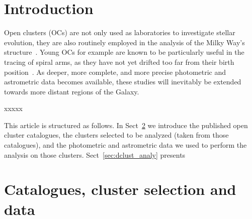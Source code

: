 \documentclass[draft]{aa}
\begin{document}

\maketitle


\section{Introduction}

 Open clusters (OCs) are not only used as laboratories to investigate stellar
 evolution, they are also routinely employed in the analysis of the Milky Way's
 structure~\citep{Loktin_1992,Moitinho_2006,Vazquez2008,Moitinho_2010}.
 Young OCs for example are known to be particularly
 useful in the tracing of spiral arms, as they have not yet drifted too far
 from their birth position~\citep{carraro_2013,Molina_2018}. As deeper, more
 complete, and more precise photometric and astrometric data becomes available,
 these studies will inevitably be extended towards more distant regions of the
 Galaxy.

 xxxxx

 This article is structured as follows. In Sect~\ref{sec:cat_clust_data} we
 introduce the published open cluster catalogues, the clusters selected to be
 analyzed (taken from those catalogues), and the photometric and astrometric
 data we used to perform the analysis on those clusters.
 Sect~\ref{sec:dclust_analy} presents



\section{Catalogues, cluster selection and data}
 \label{sec:cat_clust_data}
\end{document}
